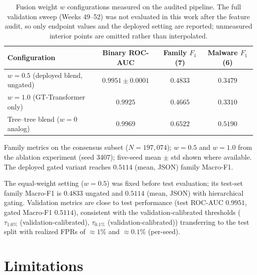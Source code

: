 \documentclass[Number]{sn-jnl}
\begin{document}
\begin{table}[htbp]
\caption{Fusion weight $w$ configurations measured on the audited pipeline. The full validation sweep (Weeks 49--52) was not evaluated in this work after the feature audit, so only endpoint values and the deployed setting are reported; unmeasured interior points are omitted rather than interpolated.}\label{tab:sensitivity_w}
\centering\footnotesize
\setlength{\tabcolsep}{3pt}
\begin{tabular*}{\linewidth}{@{\extracolsep{\fill}}lccc@{}}
\toprule
\textbf{Configuration} & \textbf{Binary ROC-AUC} & \textbf{Family $F_1$ (7)} & \textbf{Malware $F_1$ (6)} \\
\midrule
$w=0.5$ (deployed blend, ungated)    & $0.9951{\pm}0.0001$ & $0.4833$  & $0.3479$  \\
$w=1.0$ (GT-Transformer only)        & $0.9925$            & $0.4665$  & $0.3310$  \\
Tree--tree blend ($w=0$ analog)       & $0.9969$            & $0.6522$  & $0.5190$  \\
\bottomrule
\end{tabular*}
\par\vspace{2pt}\raggedright\scriptsize
Family metrics on the consensus subset ($N=197{,}074$); $w=0.5$ and $w=1.0$ from the ablation experiment (seed 3407); five-seed mean $\pm$ std shown where available. The deployed gated variant reaches $0.5114$ (mean, JSON) family Macro-F1.
\end{table}

\noindent The equal-weight setting ($w=0.5$) was fixed before test evaluation; its test-set family Macro-F1 is $0.4833$ ungated and $0.5114$ (mean, JSON) with hierarchical gating. Validation metrics are close to test performance (test ROC-AUC $0.9951$, gated Macro-F1 $0.5114$), consistent with the validation-calibrated thresholds ($\tau_{1.0\%}$ (validation-calibrated), $\tau_{0.1\%}$ (validation-calibrated)) transferring to the test split with realized FPRs of $\approx1\%$ and $\approx0.1\%$ (per-seed).


\section{Limitations}\label{sec:discussion}
\end{document}
